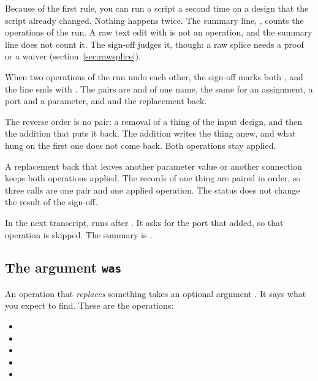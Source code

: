 Because of the first rule, you can run a script a second time on a design that
the script already changed. Nothing happens twice. The summary line,
, counts the operations of the run. A raw text edit
with  is not an operation, and the summary line does not count it.
The sign-off judges it, though: a raw splice needs a proof or a waiver
(section~\ref{sec:rawsplice}).

When two operations of the run undo each other, the sign-off marks both
, and the line ends with . The pairs are
 and  of one name, the same for an
assignment, a port and a parameter, and  and the
replacement back.

The reverse order is no pair: a removal of a thing of the input design, and then the
addition that puts it back. The addition writes the thing anew, and what hung on the first
one does not come back. Both operations stay applied.

A replacement back that leaves another parameter value or another connection keeps both
operations applied. The records of one thing are paired in order, so three calls are one
pair and one applied operation. The status does not change the result of the sign-off.



In the next transcript,  runs after . It asks
for the port that  added, so that operation is skipped. The
summary is .



\subsection*{The argument \texttt{was}}

An operation that \emph{replaces} something takes an optional argument .
It says what you expect to find. These are the operations:

\begin{itemize}
\item {}
\item {}
\item {}
\item {}
\item {}
\end{itemize}

